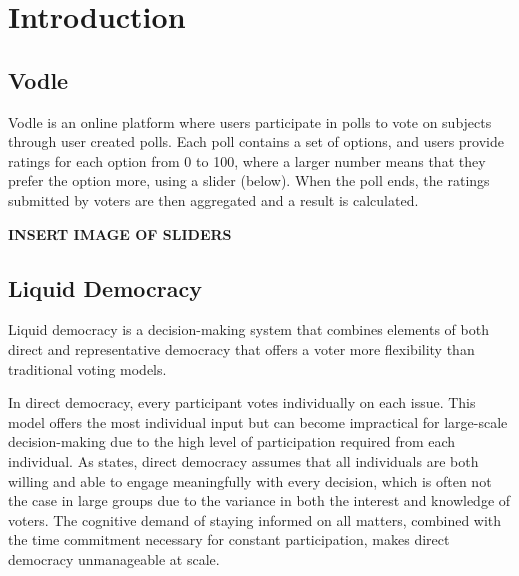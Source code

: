 \chapter{Introduction}
\label{ch:introduction}


\section{Vodle}
Vodle is an online platform where users participate in polls to vote on subjects through user created polls. Each poll contains a set of options, and users provide ratings for each option from 0 to 100, where a larger number means that they prefer the option more, using a slider (below). When the poll ends, the ratings submitted by voters are then aggregated and a result is calculated.


\textbf{INSERT IMAGE OF SLIDERS}

\section{Liquid Democracy}
Liquid democracy is a decision-making system that combines elements of both direct and representative democracy that offers a voter more flexibility than traditional voting models.

In direct democracy, every participant votes individually on each issue. This model offers the most individual input but can become impractical for large-scale decision-making due to the high level of participation required from each individual. As \cite{ford_delegative_2002} states, direct democracy assumes that all individuals are both willing and able to engage meaningfully with every decision, which is often not the case in large groups due to the variance in both the interest and knowledge of voters. The cognitive demand of staying informed on all matters, combined with the time commitment necessary for constant participation, makes direct democracy unmanageable at scale.

